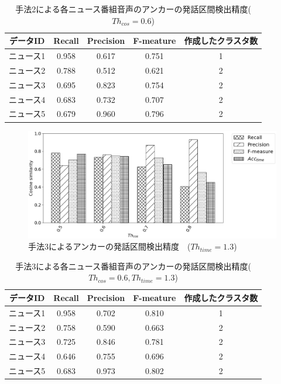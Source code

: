 \begin{table}[H]
  \begin{center}
    \caption{手法2による各ニュース番組音声のアンカーの発話区間検出精度($Th_{cos}=0.6$) }
    \begin{tabular}{|c||c|c|c|c|} \hline
データID & Recall & Precision & F-meature & 作成したクラスタ数\\ \hline
ニュース1 & 0.958 & 0.617 & 0.751 & 1 \\ \hline
ニュース2 & 0.788 & 0.512 & 0.621 & 2 \\ \hline
ニュース3 & 0.695 & 0.823 & 0.754 & 2 \\ \hline
ニュース4 & 0.683 & 0.732 & 0.707 & 2 \\ \hline
ニュース5 & 0.679 & 0.960 & 0.796 & 2 \\ \hline
    \end{tabular}
  \end{center}
\end{table}

\begin{figure}[H]
  \begin{center}
    \includegraphics[scale=0.5]{./figure/prob3_13.eps}
  \end{center}
  \caption{手法3によるアンカーの発話区間検出精度　($Th_{time}=1.3$) \label{fig:result_anchor_prob3}}
\end{figure}

\begin{table}[H]
  \begin{center}
    \caption{手法3による各ニュース番組音声のアンカーの発話区間検出精度($Th_{cos}=0.6,Th_{time}=1.3$) \label{table:prob3_eachnews}}
    \begin{tabular}{|c||c|c|c|c|} \hline
データID & Recall & Precision & F-meature & 作成したクラスタ数\\ \hline
ニュース1 & 0.958 & 0.702 & 0.810 & 1 \\ \hline
ニュース2 & 0.758 & 0.590 & 0.663 & 2 \\ \hline
ニュース3 & 0.725 & 0.846 & 0.781 & 2 \\ \hline
ニュース4 & 0.646 & 0.755 & 0.696 & 2 \\ \hline
ニュース5 & 0.683 & 0.973 & 0.802 & 2 \\ \hline
    \end{tabular}
  \end{center}
\end{table}

